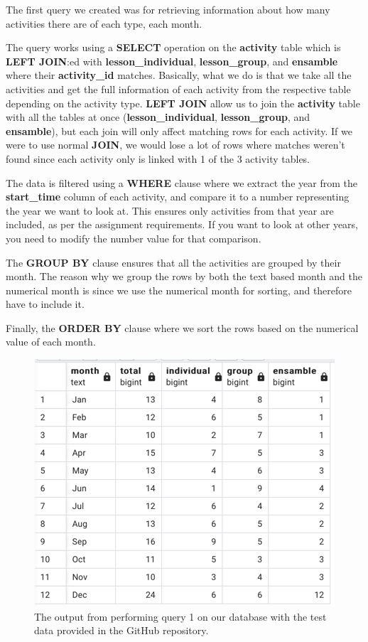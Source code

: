 \documentclass[a4paper]{scrartcl}
\begin{document}
The first query we created was for retrieving information about how many activities there are of each type, each month.

The query works using a \textbf{SELECT} operation on the \textbf{activity} table which is \textbf{LEFT JOIN}:ed with \textbf{lesson\_individual}, \textbf{lesson\_group}, and \textbf{ensamble} where their \textbf{activity\_id} matches. Basically, what we do is that we take all the activities and get the full information of each activity from the respective table depending on the activity type. \textbf{LEFT JOIN} allow us to join the \textbf{activity} table with all the tables at once (\textbf{lesson\_individual}, \textbf{lesson\_group}, and \textbf{ensamble}), but each join will only affect matching rows for each activity. If we were to use normal \textbf{JOIN}, we would lose a lot of rows where matches weren't found since each activity only is linked with 1 of the 3 activity tables.

The data is filtered using a \textbf{WHERE} clause where we extract the year from the \textbf{start\_time} column of each activity, and compare it to a number representing the year we want to look at. This ensures only activities from that year are included, as per the assignment requirements. If you want to look at other years, you need to modify the number value for that comparison.

The \textbf{GROUP BY} clause ensures that all the activities are grouped by their month. The reason why we group the rows by both the text based month and the numerical month is since we use the numerical month for sorting, and therefore have to include it. 

Finally, the \textbf{ORDER BY} clause where we sort the rows based on the numerical value of each month.

\begin{figure}[H]
    \begin{center}
      \includegraphics[scale=0.6]{query1_output.png}
      \caption{The output from performing query 1 on our database with the test data provided in the GitHub repository.}
      \label{fig:diag}
    \end{center}
  \end{figure}
\end{document}
